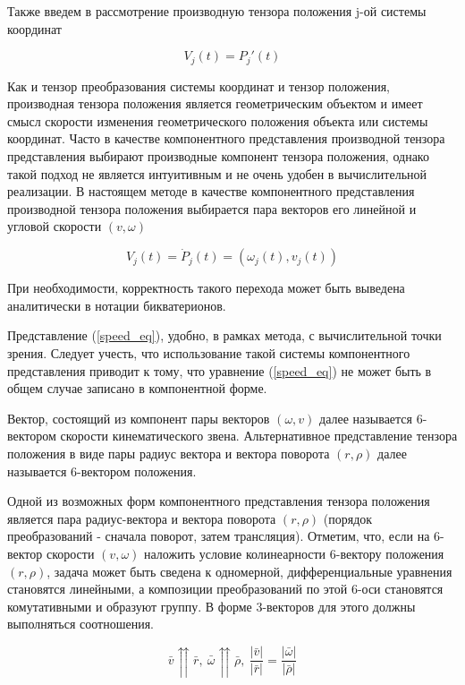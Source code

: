 \documentclass[12pt,a4paper,titlepage]{article}
\begin{document}
Также введем в рассмотрение производную тензора положения j-ой системы координат

\begin{equation}\label{speed_eq} 
V_j(t) = P_j'(t) 
\end{equation}

Как и тензор преобразования системы координат и тензор положения, производная тензора положения является геометрическим объектом и имеет смысл скорости изменения геометрического положения объекта или системы координат. Часто в качестве компонентного представления производной тензора представления выбирают производные компонент тензора положения, однако такой подход не является интуитивным и не очень удобен в вычислительной реализации. В настоящем методе в качестве компонентного представления производной тензора положения выбирается пара векторов его линейной и угловой скорости $(v,\omega)$

\begin{equation}\label{speed_eq_comp} 
V_j(t) = \dot{P}_j(t) = (\omega_j(t),v_j(t)) 
\end{equation}

При необходимости, корректность такого перехода может быть выведена аналитически в нотации бикватерионов. 

Представление (\ref{speed_eq}), удобно, в рамках метода, с вычислительной точки зрения. Следует учесть, что использование такой системы компонентного представления приводит к тому, что уравнение (\ref{speed_eq}) не может быть в общем случае записано в компонентной форме.

\colorbox{shadecolor}
{\parbox{0.9\textwidth}{Вектор, состоящий из компонент пары векторов $(\omega, v)$ далее называется 6-вектором скорости кинематического звена. Альтернативное представление тензора положения в виде пары радиус вектора и вектора поворота $(r,\rho)$ далее называется 6-вектором положения.}}

Одной из возможных форм компонентного представления тензора положения является пара радиус-вектора и вектора поворота $(r,\rho)$ (порядок преобразований - сначала поворот, затем трансляция). Отметим, что, если на 6-вектор скорости $(v,\omega)$ наложить условие колинеарности 6-вектору положения $(r,\rho)$, задача может быть сведена к одномерной, дифференциальные уравнения становятся линейными, а композиции преобразований по этой 6-оси становятся комутативными и образуют группу. В форме 3-векторов для этого должны выполняться соотношения.

\begin{equation}\label{} 
\bar{v} \upuparrows \bar{r}, \  \bar{\omega} \upuparrows \bar{\rho}, \  \frac{|\bar{v}|}{|\bar{r}|} = \frac{|\bar{\omega}|}{|\bar{\rho}|} 
\end{equation}
\end{document}
